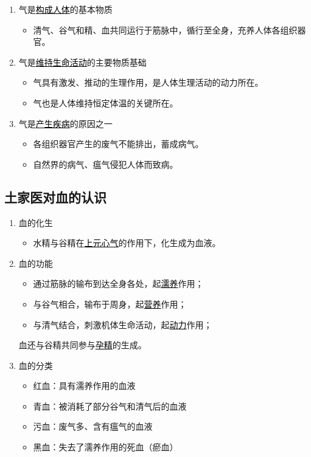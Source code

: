 \documentclass[cn,black,12pt,normal,founder]{elegantnote}
\newcommand{\redt}[1]{\textcolor{black}{{}#1}}      %
\begin{document}
\begin{enumerate}
  \item 气是\redt{\uline{构成人体}}的基本物质
  \begin{itemize}
    \item 清气、谷气和精、血共同运行于筋脉中，循行至全身，充养人体各组织器官。
  \end{itemize}
  \item 气是\redt{\uline{维持生命活动}}的主要物质基础
  \begin{itemize}
    \item 气具有激发、推动的生理作用，是人体生理活动的动力所在。
    \item 气也是人体维持恒定体温的关键所在。
  \end{itemize}
  \item 气是\redt{\uline{产生疾病}}的原因之一
  \begin{itemize}
    \item 各组织器官产生的废气不能排出，蓄成病气。
    \item 自然界的病气、瘟气侵犯人体而致病。
  \end{itemize}
\end{enumerate}

\subsection{土家医对血的认识}

\begin{enumerate}
  \item 血的化生
  \begin{itemize}
    \item 水精与谷精在\redt{\uline{上元心气}}的作用下，化生成为血液。
  \end{itemize}
  \item 血的功能
  \begin{itemize}
    \item 通过筋脉的输布到达全身各处，起\redt{\uline{濡养}}作用；
    \item 与谷气相合，输布于周身，起\redt{\uline{营养}}作用；
    \item 与清气结合，刺激机体生命活动，起\redt{\uline{动力}}作用；
  \end{itemize}
  \begin{note}
    血还与谷精共同参与\redt{\uline{孕精}}的生成。
  \end{note}
  \item 血的分类
  \begin{itemize}
    \item 红血：具有濡养作用的血液
    \item 青血：被消耗了部分谷气和清气后的血液
    \item 污血：废气多、含有瘟气的血液
    \item 黑血：失去了濡养作用的死血（瘀血）
  \end{itemize}
\end{enumerate}
\end{document}
